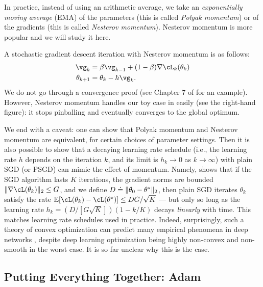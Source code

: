 \documentclass[../../book-main.tex]{subfiles}
\begin{document}
In practice, instead of using an arithmetic average, we take an \textit{exponentially moving average} (EMA) of the parameters (this is called \textit{Polyak momentum}) or of the gradients (this is called \textit{Nesterov momentum}). Nesterov momentum is more popular and we will study it here.

A stochastic gradient descent iteration with Nesterov momentum is as follows:
\begin{align}
    \vg_{k}
    &= \beta\vg_{k - 1} + (1 - \beta)\nabla \cL_{k}(\theta_{k}) \\ 
    \theta_{k + 1}
    &= \theta_{k} - h\vg_{k}.
\end{align}
We do not go through a convergence proof (see Chapter 7 of \cite{garrigos2023handbook} for an example). However, Nesterov momentum handles our toy case in  easily (see the right-hand figure): it stops pinballing and eventually converges to the global optimum.

We end with a caveat: one can show that Polyak momentum and Nesterov momentum are equivalent, for certain choices of parameter settings. Then it is also possible to show that a decaying learning rate schedule (i.e., the learning rate \(h\) depends on the iteration \(k\), and its limit is \(h_{k} \to 0\) as \(k \to \infty\)) with plain SGD (or PSGD) can mimic the effect of momentum. Namely, \cite{defazio2023optimal} shows that if the SGD algorithm lasts \(K\) iterations, the gradient norms are bounded \(\norm{\nabla \cL(\theta_{k})}_{2} \leq G\), and we define \(D \doteq \norm{\theta_{0} - \theta^{\star}}_{2}\), then plain SGD iterates \(\theta_{k}\) satisfy the rate \(\Ex[\cL(\theta_{k}) - \cL(\theta^{\star})] \leq DG/\sqrt{K}\) --- but only so long as the learning rate \(h_{k} = (D/[G\sqrt{K}])(1 - k/K)\) decays \textit{linearly} with time. This matches learning rate schedules used in practice. Indeed, surprisingly, such a theory of convex optimization can predict many empirical phenomena in deep networks \cite{schaipp2025surprising}, despite deep learning optimization being highly non-convex and non-smooth in the worst case. It is so far unclear why this is the case.


\subsection{Putting Everything Together: Adam}
\end{document}
